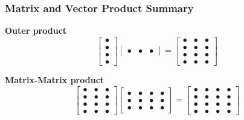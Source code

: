 \documentclass[10pt]{beamer}
\begin{document}
\begin{frame}\frametitle{Matrix and Vector Product Summary}

\textbf{Outer product}
$$
            \begin{bmatrix} \bullet  \\
                            \bullet \\
                             \bullet  \\
                             \bullet 
             \end{bmatrix} 
          \begin{bmatrix} \bullet& \bullet&  \bullet \end{bmatrix}
          =
          \begin{bmatrix}\bullet & \bullet & \bullet \\
                    \bullet & \bullet & \bullet \\
                    \bullet & \bullet & \bullet \\
                    \bullet & \bullet & \bullet \end{bmatrix}
$$

\textbf{Matrix-Matrix product}
\begin{equation*}
    \begin{bmatrix}\bullet & \bullet & \bullet \\
                    \bullet & \bullet & \bullet \\
                    \bullet & \bullet & \bullet \\
                    \bullet & \bullet & \bullet \end{bmatrix}
    \begin{bmatrix}\bullet & \bullet & \bullet & \bullet \\
                    \bullet & \bullet & \bullet & \bullet \\
                    \bullet & \bullet & \bullet & \bullet \end{bmatrix}
    =
    \begin{bmatrix}\bullet & \bullet & \bullet & \bullet  \\
                    \bullet & \bullet & \bullet & \bullet \\
                    \bullet & \bullet & \bullet & \bullet \\
                    \bullet & \bullet & \bullet & \bullet \end{bmatrix}
\end{equation*}
\end{frame}
\end{document}
